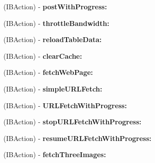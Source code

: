 \begin{DoxyCompactItemize}
\item 
\hypertarget{interface_app_delegate_a4d9bbab2eacd4f9218efa3727fbd02bf}{
(\-I\-B\-Action) -\/ {\bfseries post\-With\-Progress\-:}}
\label{interface_app_delegate_a4d9bbab2eacd4f9218efa3727fbd02bf}

\item 
\hypertarget{interface_app_delegate_ae80de33af1d53d57d24dfa85ea56d543}{
(\-I\-B\-Action) -\/ {\bfseries throttle\-Bandwidth\-:}}
\label{interface_app_delegate_ae80de33af1d53d57d24dfa85ea56d543}

\item 
\hypertarget{interface_app_delegate_a54f614d323c51ccc4b9f481ddce8ff77}{
(\-I\-B\-Action) -\/ {\bfseries reload\-Table\-Data\-:}}
\label{interface_app_delegate_a54f614d323c51ccc4b9f481ddce8ff77}

\item 
\hypertarget{interface_app_delegate_ac380181c5d1e01d047ed5937d615f3b6}{
(\-I\-B\-Action) -\/ {\bfseries clear\-Cache\-:}}
\label{interface_app_delegate_ac380181c5d1e01d047ed5937d615f3b6}

\item 
\hypertarget{interface_app_delegate_a70ac16ace7467246814859f19b0fc65c}{
(\-I\-B\-Action) -\/ {\bfseries fetch\-Web\-Page\-:}}
\label{interface_app_delegate_a70ac16ace7467246814859f19b0fc65c}

\item 
\hypertarget{interface_app_delegate_aed8bd6c24d0a5ea30b1c339eaae5386f}{
(\-I\-B\-Action) -\/ {\bfseries simple\-U\-R\-L\-Fetch\-:}}
\label{interface_app_delegate_aed8bd6c24d0a5ea30b1c339eaae5386f}

\item 
\hypertarget{interface_app_delegate_a31be6a08dc6a3f484bc48210daf92f4a}{
(\-I\-B\-Action) -\/ {\bfseries \-U\-R\-L\-Fetch\-With\-Progress\-:}}
\label{interface_app_delegate_a31be6a08dc6a3f484bc48210daf92f4a}

\item 
\hypertarget{interface_app_delegate_a65dab657243398839f2c784bf000089c}{
(\-I\-B\-Action) -\/ {\bfseries stop\-U\-R\-L\-Fetch\-With\-Progress\-:}}
\label{interface_app_delegate_a65dab657243398839f2c784bf000089c}

\item 
\hypertarget{interface_app_delegate_a2cade9ac0202476ed05e61f80bf264d7}{
(\-I\-B\-Action) -\/ {\bfseries resume\-U\-R\-L\-Fetch\-With\-Progress\-:}}
\label{interface_app_delegate_a2cade9ac0202476ed05e61f80bf264d7}

\item 
\hypertarget{interface_app_delegate_ac4539e36ee04667d57b2c8e04d86ab2b}{
(\-I\-B\-Action) -\/ {\bfseries fetch\-Three\-Images\-:}}
\label{interface_app_delegate_ac4539e36ee04667d57b2c8e04d86ab2b}


\end{DoxyCompactItemize}
